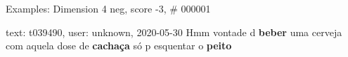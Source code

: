 \begin{frame}{Examples: Dimension 4 neg, score -3, \# 000001}
\footnotesize
\begin{alertblock}{text: t039490, user: unknown, 2020-05-30}
Hmm vontade d \textbf{beber} uma cerveja com aquela dose de \textbf{cachaça} só 
p esquentar o \textbf{peito} 
\end{alertblock}
\end{frame}
